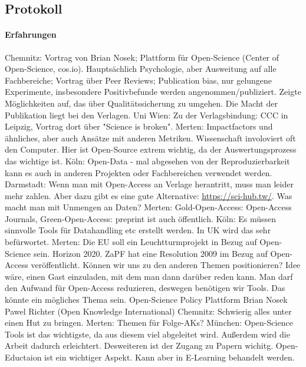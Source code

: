   \subsection*{Protokoll}
    \paragraph{Erfahrungen}
      \begin{outline}
        \1 Chemnitz: Vortrag von Brian Nosek; Plattform für Open-Science (Center of Open-Science, cos.io). Hauptsächlich Psychologie, aber Ausweitung auf alle Fachbereiche; Vortrag über Peer Reviews; Publication bias, nur gelungene Experimente, insbesondere Positivbefunde werden angenommen/publiziert. Zeigte Möglichkeiten auf, das über Qualitätssicherung zu umgehen. Die Macht der Publikation liegt bei den Verlagen.
        \1 Uni Wien: Zu der Verlagsbindung: CCC in Leipzig, Vortrag dort über "Science is broken".
        \1 Merten: Impactfactors und ähnliches, aber auch Ansätze mit anderen Metriken. Wissenschaft involoviert oft den Computer. Hier ist Open-Source extrem wichtig, da der Auswertungsprozess das wichtige ist.
        \1 Köln: Open-Data - mal abgesehen von der Reproduzierbarkeit kann es auch in anderen Projekten oder Fachbereichen verwendet werden.
        \1 Darmstadt: Wenn man mit Open-Access an Verlage herantritt, muss man leider mehr zahlen. Aber dazu gibt es eine gute Alternative: \url{https://sci-hub.tw/}. Was macht man mit Unmengen an Daten?
        \1 Merten: Gold-Open-Access: Open-Access Journals, Green-Open-Access: preprint ist auch öffentlich.
        \1 Köln: Es müssen sinnvolle Tools für Datahandling etc erstellt werden. In UK wird das sehr befürwortet.
        \1 Merten: Die EU soll ein Leuchtturmprojekt in Bezug auf Open-Science sein. Horizon 2020. ZaPF hat eine Resolution 2009 im Bezug auf Open-Access veröffentlicht. Können wir uns zu den anderen Themen positionieren? Idee wäre, einen Gast einzuladen, mit dem man dann darüber reden kann. Man darf den Aufwand für Open-Access reduzieren, deswegen benötigen wir Tools. Das könnte ein mögliches Thema sein.
          \2 Open-Science Policy Plattform
          \2 Brian Nosek
          \2 Pawel Richter (Open Knowledge International)
        \1 Chemnitz: Schwierig alles unter einen Hut zu bringen.
        \1 Merten: Themen für Folge-AKs?
        \1 München: Open-Science Tools ist das wichtigste, da aus diesem viel abgeleitet wird. Außerdem wird die Arbeit dadurch erleichtert. Desweiteren ist der Zugang zu Papern wichitg.
        \1 Open-Eductaion ist ein wichtiger Aspekt. Kann aber in E-Learning behandelt werden.
      \end{outline}

